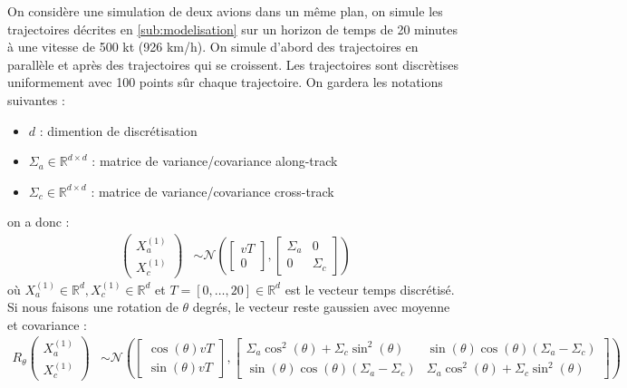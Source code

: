 \documentclass[a4paper, 12pt,twoside]{article}
\numberwithin{equation}{subsection}
\begin{document}
	On considère une simulation de deux avions dans un même plan, on simule les trajectoires décrites en \ref{sub:modelisation} sur un horizon de temps de 20 minutes à une vitesse de 500 kt (926 km/h). On simule d'abord des trajectoires en parallèle et après des trajectoires qui se croissent. Les trajectoires sont discrètises uniformement avec 100 points sûr chaque trajectoire. On gardera les notations suivantes : 
	\begin{itemize}
		\item $d$ : dimention de discrétisation
		\item $\Sigma_a \in \mathbb{R}^{d \times d}$ : matrice de variance/covariance along-track
		\item $\Sigma_c \in \mathbb{R}^{d \times d}$ : matrice de variance/covariance cross-track 
	\end{itemize}
	on a donc :
	\begin{align}
		\left( \begin{array}{c}
			X^{(1)}_a \\
			X^{(1)}_c
		\end{array} \right) &\sim \mathcal{N} \left( \left[\begin{array}{c}
			vT \\ 0
		\end{array} \right] ,\left[ \begin{array}{cc}
			\Sigma_a & 0 \\
			0 & \Sigma_c
		\end{array} \right] \right)
	\end{align}
	où $X^{(1)}_a\in \mathbb{R}^d, X^{(1)}_c \in \mathbb{R}^d$ et $T=[0,\ldots,20]\in \mathbb{R}^d$ est le vecteur temps discrétisé. Si nous faisons une rotation de $\theta$ degrés, le vecteur reste gaussien avec moyenne et covariance : 
	\begin{align}
		R_{\theta} \left( \begin{array}{c}
			X^{(1)}_a \\
			X^{(1)}_c
		\end{array} \right) &\sim \mathcal{N} \left( \left[\begin{array}{c}
			\cos(\theta)vT \\ \sin(\theta)vT
		\end{array} \right] ,\left[ 
		\begin{array}{cc}
			\Sigma_a \cos^2(\theta) + \Sigma_c \sin^2(\theta)  & \sin(\theta)\cos(\theta)(\Sigma_a-\Sigma_c) \\
			\sin(\theta)\cos(\theta)(\Sigma_a-\Sigma_c) & \Sigma_a \cos^2(\theta) + \Sigma_c \sin^2(\theta)
		\end{array} 
		\right] \right)
	\end{align}
\end{document}
